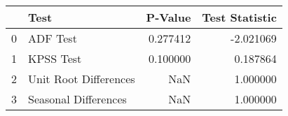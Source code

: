 \documentclass{article}
\begin{document}
\begin{center}
\begin{tabular}{llrr}
    \toprule
    {} &                   Test &   P-Value &  Test Statistic \\
    \midrule
    0 &               ADF Test &  0.277412 &       -2.021069 \\
    1 &              KPSS Test &  0.100000 &        0.187864 \\
    2 &  Unit Root Differences &       NaN &        1.000000 \\
    3 &   Seasonal Differences &       NaN &        1.000000 \\
    \bottomrule
\end{tabular}
\end{center}



\end{document}
